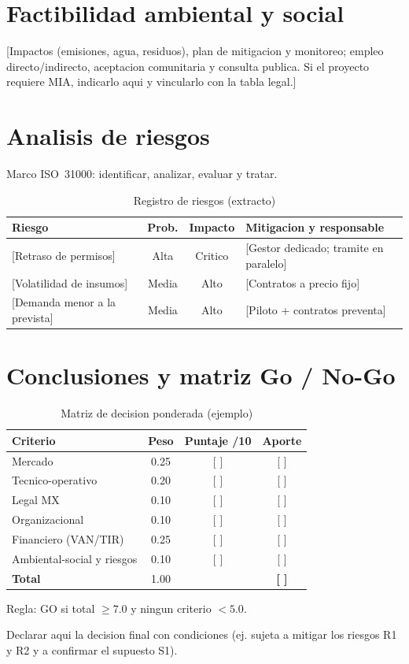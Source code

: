 \documentclass[12pt]{article}
\begin{document}
\section{Factibilidad ambiental y social}
\label{sec:amb}
[Impactos (emisiones, agua, residuos), plan de mitigacion y monitoreo;
empleo directo/indirecto, aceptacion comunitaria y consulta publica.
Si el proyecto requiere MIA, indicarlo aqui y vincularlo con la tabla
legal.]

\section{Analisis de riesgos}
Marco ISO~31000: identificar, analizar, evaluar y tratar.
\begin{table}[h]
  \centering
  \caption{Registro de riesgos (extracto)}
  \begin{tabular}{p{}ccp{}}
    \toprule
    Riesgo & Prob. & Impacto & Mitigacion y responsable \\
    \midrule
    {[Retraso de permisos]} & Alta & Critico & [Gestor dedicado; tramite en paralelo] \\
    {[Volatilidad de insumos]} & Media & Alto & [Contratos a precio fijo] \\
    {[Demanda menor a la prevista]} & Media & Alto & [Piloto + contratos preventa] \\
    \bottomrule
  \end{tabular}
\end{table}

\section{Conclusiones y matriz Go / No-Go}
\label{sec:gongo}
\begin{table}[h]
  \centering
  \caption{Matriz de decision ponderada (ejemplo)}
  \begin{tabular}{lccc}
    \toprule
    Criterio & Peso & Puntaje /10 & Aporte \\
    \midrule
    Mercado & 0.25 & [ ] & [ ] \\
    Tecnico-operativo & 0.20 & [ ] & [ ] \\
    Legal MX & 0.10 & [ ] & [ ] \\
    Organizacional & 0.10 & [ ] & [ ] \\
    Financiero (VAN/TIR) & 0.25 & [ ] & [ ] \\
    Ambiental-social y riesgos & 0.10 & [ ] & [ ] \\
    \midrule
    \textbf{Total} & 1.00 & & \textbf{[ ]} \\
    \bottomrule
  \end{tabular}
\end{table}
Regla: GO si total $\geq 7.0$ y ningun criterio $< 5.0$.
\begin{bftGoBox}
  Declarar aqui la decision final con condiciones (ej. sujeta a mitigar
  los riesgos R1 y R2 y a confirmar el supuesto S1).
\end{bftGoBox}
\end{document}
